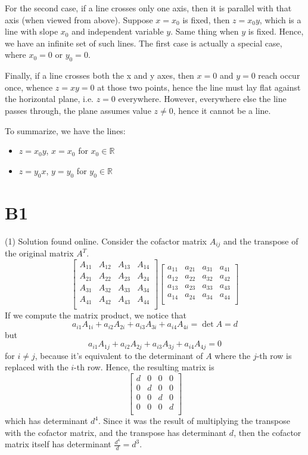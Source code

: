 \documentclass{book}
\begin{document}
For the second case, if a line crosses only one axis, then it is parallel with that axis (when viewed from above). Suppose $x = x_0$ is fixed, then $z = x_0 y$, which is a line with slope $x_0$ and independent variable $y$. Same thing when $y$ is fixed. Hence, we have an infinite set of such lines. The first case is actually a special case, where $x_0 = 0$ or $y_0 = 0$.

Finally, if a line crosses both the x and y axes, then $x = 0$ and $y = 0$ reach occur once, whence $z = xy = 0$ at those two points, hence the line must lay flat against the horizontal plane, i.e. $z = 0$ everywhere. However, everywhere else the line passes through, the plane assumes value $z \neq 0$, hence it cannot be a line.

To summarize, we have the lines:
\begin{itemize}
  \item $z = x_0 y$, $x = x_0$ for $x_0 \in \mathbb{R}$
  \item $z = y_0 x$, $y = y_0$ for $y_0 \in \mathbb{R}$
\end{itemize}

\section*{B1}
(1)
Solution found online. Consider the cofactor matrix $A_{ij}$ and the transpose of the original matrix $A^T$.
$$
\begin{bmatrix}
  A_{11} & A_{12} & A_{13} & A_{14} \\
  A_{21} & A_{22} & A_{23} & A_{24} \\
  A_{31} & A_{32} & A_{33} & A_{34} \\
  A_{41} & A_{42} & A_{43} & A_{44} \\
\end{bmatrix}
\begin{bmatrix}
  a_{11} & a_{21} & a_{31} & a_{41} \\
  a_{12} & a_{22} & a_{32} & a_{42} \\
  a_{13} & a_{23} & a_{33} & a_{43} \\
  a_{14} & a_{24} & a_{34} & a_{44} \\
\end{bmatrix}
$$
If we compute the matrix product, we notice that
$$a_{i1} A_{1i} + a_{i2} A_{2i} + a_{i3} A_{3i} + a_{i4} A_{4i} = \det{A} = d$$
but
$$a_{i1} A_{1j} + a_{i2} A_{2j} + a_{i3} A_{3j} + a_{i4} A_{4j} = 0$$
for $i \neq j$, because it's equivalent to the determinant of $A$ where the $j$-th row is replaced with the $i$-th row. Hence, the resulting matrix is
$$
\begin{bmatrix}
  d & 0 & 0 & 0 \\
  0 & d & 0 & 0 \\
  0 & 0 & d & 0 \\
  0 & 0 & 0 & d \\
\end{bmatrix}
$$
which has determinant $d^4$. Since it was the result of multiplying the transpose with the cofactor matrix, and the transpose has determinant $d$, then the cofactor matrix itself has determinant $\frac{d^4}{d} = d^3$.
\end{document}

